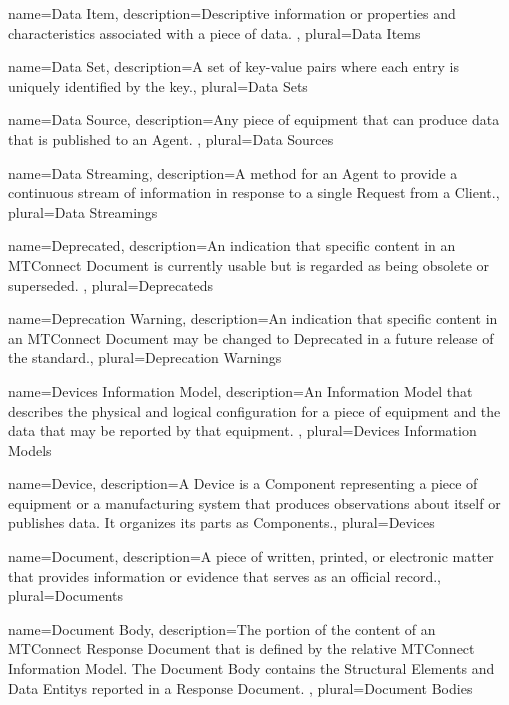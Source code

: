 {
    name={Data Item},
	description={Descriptive information or properties and characteristics associated with a piece of data.
},
	plural={Data Items}
}

{
    name={Data Set},
	description={A set of \glspl{key-value pair} where each entry is uniquely identified by the \gls{key}.},
	plural={Data Sets}
}

{
    name={Data Source},
	description={Any piece of equipment that can produce data that is published to an \gls{Agent}.
},
	plural={Data Sources}
}

{
    name={Data Streaming},
	description={A method for an \gls{Agent} to provide a continuous stream of information in response to a single \gls{Request} from a \gls{Client}.},
	plural={Data Streamings}
}

{
    name={Deprecated},
	description={An indication that specific content in an \gls{MTConnect Document} is currently usable but is regarded as being obsolete or superseded. },
	plural={Deprecateds}
}

{
    name={Deprecation Warning},
	description={An indication that specific content in an \gls{MTConnect Document} may be changed to \gls{Deprecated} in a future release of the standard.},
	plural={Deprecation Warnings}
}

{
    name={Devices Information Model},
	description={An \gls{Information Model} that describes the physical and logical configuration for a piece of equipment and the data that may be reported by that equipment. },
	plural={Devices Information Models}
}

{
    name={Device},
	description={A \gls{Device} is a \gls{Component} representing a piece of equipment or a manufacturing system that produces observations about itself or publishes data. It organizes its parts as \glspl{Component}.},
	plural={Devices}
}

{
    name={Document},
	description={A piece of written, printed, or electronic matter that provides information or evidence that serves as an official record.},
	plural={Documents}
}

{
    name={Document Body},
	description={The portion of the content of an \gls{MTConnect Response Document} that is defined by the relative \gls{MTConnect Information Model}. The \gls{Document Body} contains the \glspl{Structural Element} and \glspl{Data Entity} reported in a \gls{Response Document}.
},
	plural={Document Bodies}
}

